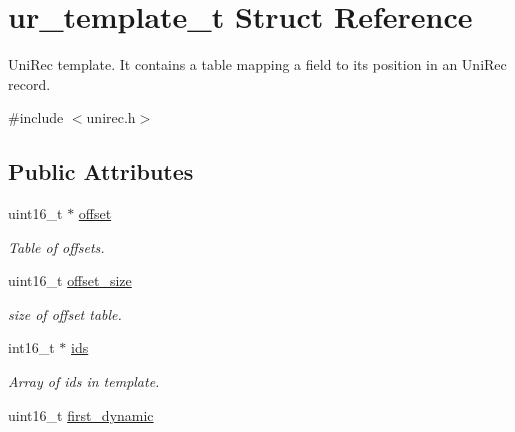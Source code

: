 \hypertarget{structur__template__t}{}\section{ur\+\_\+template\+\_\+t Struct Reference}
\label{structur__template__t}


Uni\+Rec template. It contains a table mapping a field to its position in an Uni\+Rec record.  




{\ttfamily \#include $<$unirec.\+h$>$}

\subsection*{Public Attributes}
\begin{DoxyCompactItemize}
\item 
uint16\+\_\+t $\ast$ \hyperlink{structur__template__t_a4aedfaa872d40f452909dc395a0fbc4a}{offset}\hypertarget{structur__template__t_a4aedfaa872d40f452909dc395a0fbc4a}{}\label{structur__template__t_a4aedfaa872d40f452909dc395a0fbc4a}

\begin{DoxyCompactList}\small\item\em Table of offsets. \end{DoxyCompactList}\item 
uint16\+\_\+t \hyperlink{structur__template__t_ae3458bcec0d7af5a00cfdb528f4f36b7}{offset\+\_\+size}\hypertarget{structur__template__t_ae3458bcec0d7af5a00cfdb528f4f36b7}{}\label{structur__template__t_ae3458bcec0d7af5a00cfdb528f4f36b7}

\begin{DoxyCompactList}\small\item\em size of offset table. \end{DoxyCompactList}\item 
int16\+\_\+t $\ast$ \hyperlink{structur__template__t_acf8005fa9976d0fbe61c40aefeea199c}{ids}\hypertarget{structur__template__t_acf8005fa9976d0fbe61c40aefeea199c}{}\label{structur__template__t_acf8005fa9976d0fbe61c40aefeea199c}

\begin{DoxyCompactList}\small\item\em Array of ids in template. \end{DoxyCompactList}\item 
uint16\+\_\+t \hyperlink{structur__template__t_a3ff58f0882adb970deec7c6f7faa7f7c}{first\+\_\+dynamic}\hypertarget{structur__template__t_a3ff58f0882adb970deec7c6f7faa7f7c}{}\label{structur__template__t_a3ff58f0882adb970deec7c6f7faa7f7c}


\end{DoxyCompactItemize}
